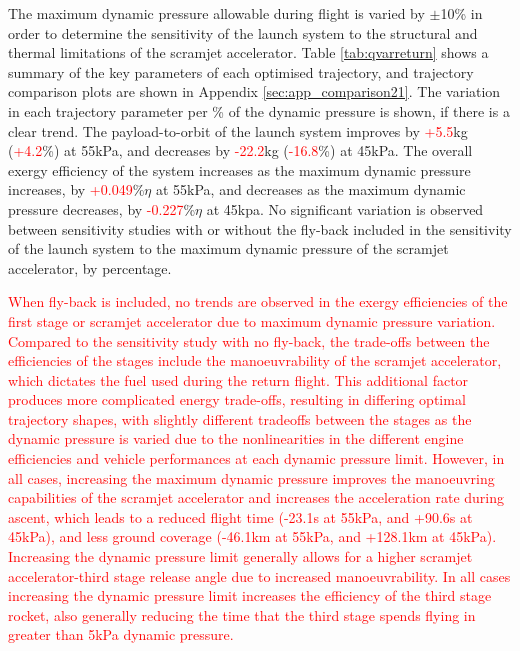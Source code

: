 The maximum dynamic pressure allowable during flight is varied by $\pm$10\% in order to determine the sensitivity of the launch system to the structural and thermal limitations of the scramjet accelerator.  
Table \ref{tab:qvarreturn} shows a summary of the key parameters of each optimised trajectory, and trajectory comparison plots are shown in Appendix \ref{sec:app_comparison21}. The variation in each trajectory parameter per \% of the dynamic pressure is shown, if there is a clear trend. The payload-to-orbit of the launch system improves by \textcolor{red}{+5.5}kg (\textcolor{red}{+4.2}\%) at 55kPa, and decreases by \textcolor{red}{-22.2}kg (\textcolor{red}{-16.8}\%) at 45kPa.
The overall exergy efficiency of the system increases as the maximum dynamic pressure increases, by \textcolor{red}{+0.049}\%$\eta$ at 55kPa, and decreases as the maximum dynamic pressure decreases, by \textcolor{red}{-0.227}\%$\eta$ at 45kpa. 
No significant variation is observed between sensitivity studies with or without the fly-back included in the sensitivity of the launch system to the maximum dynamic pressure of the scramjet accelerator, by percentage.

\textcolor{red}{
When fly-back is included, no trends are observed in the exergy efficiencies of the first stage or scramjet accelerator due to maximum dynamic pressure variation. Compared to the sensitivity study with no fly-back, the trade-offs between the efficiencies of the stages include the manoeuvrability of the scramjet accelerator, which dictates the fuel used during the return flight. This additional factor produces more complicated energy trade-offs, resulting in differing optimal trajectory shapes, with slightly different tradeoffs between the stages as the dynamic pressure is varied due to the nonlinearities in the different engine efficiencies and vehicle performances at each dynamic pressure limit.
However, in all cases, increasing the maximum dynamic pressure improves the manoeuvring capabilities of the scramjet accelerator and increases the acceleration rate during ascent, which leads to a reduced flight time (-23.1s at 55kPa, and +90.6s at 45kPa), and less ground coverage (-46.1km at 55kPa, and +128.1km at 45kPa). Increasing the dynamic pressure limit generally allows for a higher scramjet accelerator-third stage release angle due to increased manoeuvrability. In all cases increasing the dynamic pressure limit increases the efficiency of the third stage rocket, also generally reducing the time that the third stage spends flying in greater than 5kPa dynamic pressure. }


